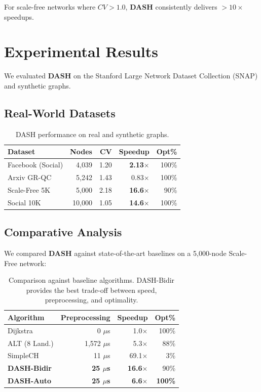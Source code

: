 \documentclass[10pt,twocolumn,letterpaper]{article}
\newcommand{\dash}{\textbf{DASH}}
\begin{document}
For scale-free networks where $CV > 1.0$, \dash{} consistently delivers $>10\times$ speedups.

\section{Experimental Results}

We evaluated \dash{} on the Stanford Large Network Dataset Collection (SNAP) and synthetic graphs.

\subsection{Real-World Datasets}

\begin{table}[h]
\centering
\begin{tabular}{lrrrr}
\toprule
Dataset & Nodes & CV & Speedup & Opt\% \\
\midrule
Facebook (Social) & 4,039 & 1.20 & \textbf{2.13$\times$} & 100\% \\
Arxiv GR-QC & 5,242 & 1.43 & 0.83$\times$ & 100\% \\
Scale-Free 5K & 5,000 & 2.18 & \textbf{16.6$\times$} & 90\% \\
Social 10K & 10,000 & 1.05 & \textbf{14.6$\times$} & 100\% \\
\bottomrule
\end{tabular}
\caption{DASH performance on real and synthetic graphs.}
\end{table}

\subsection{Comparative Analysis}

We compared \dash{} against state-of-the-art baselines on a 5,000-node Scale-Free network:

\begin{table}[h]
\centering
\begin{tabular}{lrrr}
\toprule
Algorithm & Preprocessing & Speedup & Opt\% \\
\midrule
Dijkstra & 0 $\mu$s & 1.0$\times$ & 100\% \\
ALT (8 Land.) & 1,572 $\mu$s & 5.3$\times$ & 88\% \\
SimpleCH & 11 $\mu$s & 69.1$\times$ & 3\% \\
\textbf{\dash-Bidir} & \textbf{25 $\mu$s} & \textbf{16.6$\times$} & 90\% \\
\textbf{\dash-Auto} & \textbf{25 $\mu$s} & \textbf{6.6$\times$} & \textbf{100\%} \\
\bottomrule
\end{tabular}
\caption{Comparison against baseline algorithms. DASH-Bidir provides the best trade-off between speed, preprocessing, and optimality.}
\end{table}
\end{document}
